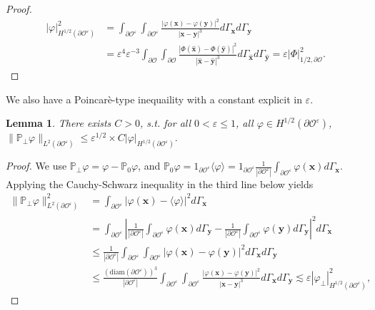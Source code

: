 \documentclass[]{article}
\newtheorem{lemma}{Lemma}
\numberwithin{equation}{section}
\numberwithin{theorem}{section}
\numberwithin{lemma}{section}
\numberwithin{corollary}{section}
\numberwithin{proposition}{section}
\numberwithin{definition}{section}
\newcommand{\re}{\varepsilon}
\renewcommand{\O}{\mathcal{O}}
\begin{document}
\begin{appendices}
\begin{proof}
\begin{align*}
				|\varphi |^2_{H^{1/2}(\partial \mathcal{O}^{\re})} &= \int_{\partial \mathcal{O}^{\re}} \int_{\partial \mathcal{O}^{\re}} \frac{|\varphi(\boldsymbol{x})-\varphi(\boldsymbol{y})|^2}{|\boldsymbol{x}-\boldsymbol{y}|^3} d\Gamma_{\boldsymbol{x}} d\Gamma_{\boldsymbol{y}} \\
				&= \re^{4} \re^{-3}  \int_{\partial \mathcal{O}} \int_{\partial \mathcal{O}} \frac{|\Phi(\hat{\boldsymbol{x}})-\Phi(\hat{\boldsymbol{y}})|^2}{|\hat{\boldsymbol{x}}-\hat{\boldsymbol{y}}|^3} d\Gamma_{\hat{\boldsymbol{x}}} d\Gamma_{\hat{\boldsymbol{y}}} = \re |\Phi|^2_{1/2, \partial \mathcal{O}}.
			\end{align*}
		\end{proof}
		We also have a Poincar\`e-type inequaility with a constant explicit in $\re$. 
		\begin{lemma}
			\label{lem:L^2_to_half}
			There exists $C>0$, s.t. for all $0<\re\leq 1$, all $\varphi\in H^{1/2}(\partial\mathcal{O}^{\re})$, 
			$\| \mathbb{P}_{\perp} \varphi \|_{L^2(\partial\mathcal{O}^{\re})} \leq  \re^{1/2} \times C| \varphi |_{H^{1/2}(\partial \mathcal{O}^{\re})}.$ 
		\end{lemma}
		\begin{proof}
			We use $\mathbb{P}_{\perp} \varphi = \varphi - \mathbb{P}_0 \varphi$, and $\mathbb{P}_0 \varphi = 1_{\partial\O^{\re}}\langle \varphi \rangle=1_{\partial\O^{\re}}\frac{1}{|\partial \mathcal{O}^{\re}|} \int_{\partial \mathcal{O}^{\re}} \varphi (\boldsymbol{x}) d\Gamma_{\boldsymbol{x}}$.
			Applying the Cauchy-Schwarz inequality in the third line below yields 
			\begin{align*}%
				\|\mathbb{P}_{\perp} \varphi \|^2_{L^2(\partial\mathcal{O}^{\re})} &= \int_{\partial\mathcal{O}^{\re}} \left|\varphi (\boldsymbol{x}) - \langle \varphi \rangle \right|^2 d \Gamma_{\boldsymbol{x}} \\&= \int_{\partial\mathcal{O}^{\re}} \left|\frac{1}{| \partial\mathcal{O}^{\re} |} \int_{\partial\mathcal{O}^{\re}} \varphi (\boldsymbol{x})  d \Gamma_{\boldsymbol{y}} - \frac{1}{|\partial\mathcal{O}^{\re}|} \int_{\partial\mathcal{O}^{\re}} \varphi(\boldsymbol{y}) d \Gamma_{\boldsymbol{y}} \right|^2 d \Gamma_{\boldsymbol{x}} \\
				&\leq \frac{1}{|\partial\mathcal{O}^{\re}|} \int_{\partial\mathcal{O}^{\re}} \int_{\partial\mathcal{O}^{\re}} | \varphi(\boldsymbol{x}) - \varphi (\boldsymbol{y}) |^2 d \Gamma_{\boldsymbol{x}} d \Gamma_{\boldsymbol{y}} \\
				&\leq  \frac{(\text{diam}(\partial \mathcal{O}^{\re}))^3}{|\partial\mathcal{O}^{\re}|} \int_{\partial\mathcal{O}^{\re}} \int_{\partial\mathcal{O}^{\re}} \frac{| \varphi (\boldsymbol{x}) - \varphi (\boldsymbol{y})|^2}{|\boldsymbol{x} - \boldsymbol{y}|^3} d \Gamma_{\boldsymbol{x}} d \Gamma_{\boldsymbol{y}} \lesssim \re |\varphi_{\perp} |^2_{H^{1/2}(\partial \mathcal{O}^{\re})},

\end{align*}
\end{proof}
\end{appendices}
\end{document}
